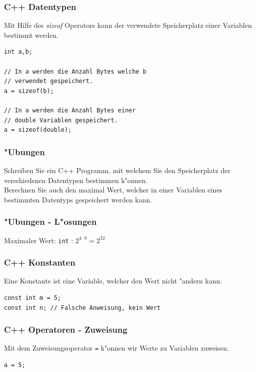 \documentclass{beamer}
\begin{document}
\begin{frame}[fragile]
	\frametitle{C++ Datentypen}
	Mit Hilfe des \emph{sizeof} Operators kann der verwendete Speicherplatz einer
	Variablen bestimmt werden.

	\vspace{3mm}

	\begin{lstlisting}
int a,b;

// In a werden die Anzahl Bytes welche b
// verwendet gespeichert.
a = sizeof(b);

// In a werden die Anzahl Bytes einer
// double Variablen gespeichert.
a = sizeof(double);
	\end{lstlisting}
\end{frame}

\frame
{
	\frametitle{"Ubungen}
	Schreiben Sie ein C++ Programm, mit welchem Sie den Speicherplatz
	der verschiedenen Datentypen bestimmen k"onnen.\\
	Berechnen Sie auch den maximal Wert, welcher in einer Variablen
	eines bestimmten Datentyps gespeichert werden kann.
}

\begin{frame}[fragile]
	\frametitle{"Ubungen - L"osungen}
	
	Maximaler Wert: \verb|int| : $2^{4 \cdot 8} = 2^{32}$
\end{frame}

\begin{frame}[fragile]
	\frametitle{C++ Konstanten}
	Eine Konstante ist eine Variable, welcher den Wert nicht "andern kann.
	\begin{lstlisting}
const int m = 5;
const int n; // Falsche Anweisung, kein Wert
	\end{lstlisting}
\end{frame}

\begin{frame}[fragile]
	\frametitle{C++ Operatoren - Zuweisung}
	Mit dem Zuweisungsoperator \verb|=| k"onnen wir Werte zu Variablen
	zuweisen.

	\vspace{3mm}

	\begin{lstlisting}
a = 5;
	\end{lstlisting}
\end{frame}
\end{document}
